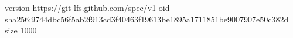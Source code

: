 version https://git-lfs.github.com/spec/v1
oid sha256:9744dbc56f5ab2f913cd3f40463f19613be1895a1711851be9007907e50c382d
size 1000

